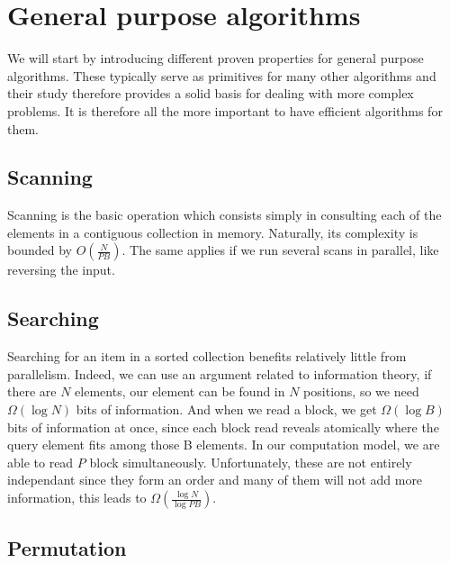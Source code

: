
\section{General purpose algorithms}

We will start by introducing different proven properties for general purpose algorithms. These typically serve as primitives for many other algorithms and their study therefore provides a solid basis for dealing with more complex problems. It is therefore all the more important to have efficient algorithms for them.

\subsection{Scanning}

Scanning is the basic operation which consists simply in consulting each of the elements in a contiguous collection in memory. Naturally, its complexity is bounded by $O(\frac{N}{PB})$. The same applies if we run several scans in parallel, like reversing the input.

\subsection{Searching}

Searching for an item in a sorted collection benefits relatively little from parallelism. Indeed, we can use an argument related to information theory, if there are $N$ elements, our element can be found in $N$ positions, so we need $\Omega(\log N)$ bits of information. And when we read a block, we get $\Omega(\log B)$ bits of information at once, since each block read reveals atomically where the query element fits among those B elements. In our computation model, we are able to read $P$ block simultaneously. Unfortunately, these are not entirely independant since they form an order and many of them will not add more information, this leads to $\Omega(\frac{\log N}{\log PB})$. 


\subsection{Permutation}



